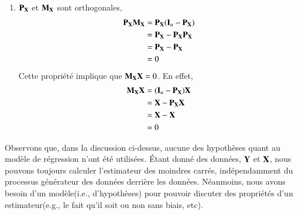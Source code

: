 \documentclass[10pt, reqno]{amsart}
\begin{document}
\begin{enumerate}
\item $\mathbf P_\mathbf X$ et $\mathbf M_\mathbf X$ sont orthogonales,
\begin{align*}
\mathbf P_\mathbf X\mathbf M_\mathbf X &= \mathbf P_\mathbf X(\mathbf{I}_n -  \mathbf P_\mathbf X)\\
& =  \mathbf P_\mathbf X -  \mathbf P_\mathbf X \mathbf P_\mathbf X\\
&= \mathbf P_\mathbf X- \mathbf P_\mathbf X\\
&=0
\end{align*}
Cette propriété implique que $\mathbf M_\mathbf X\mathbf X = 0$. En effet,
\begin{align*}
\mathbf M_\mathbf X\mathbf X &= (\mathbf{I}_n - \mathbf P_\mathbf X)\mathbf X\\ 
&= \mathbf X-\mathbf P_\mathbf X\mathbf X\\
& = \mathbf X - \mathbf X\\
& = 0
\end{align*}
\end{enumerate}
Observons que, dans la discussion ci-dessus, aucune des hypothèses quant au modèle de régression n'ont été utilisées. \'Etant donné des données, $\mathbf Y$ et $\mathbf X$, nous pouvons toujours calculer l'estimateur des moindres carrés, indépendamment du processus générateur des données derrière les données. Néanmoins, nous avons besoin d'un modèle(i.e., d'hypothèses) pour pouvoir discuter des propriétés d'un estimateur(e.g., le fait qu'il soit ou non sans biais, etc).
\end{document}
